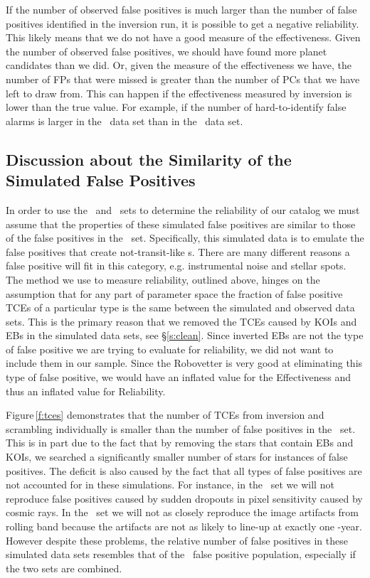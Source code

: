 If the number of observed false positives is much larger than the number of false positives identified in the inversion run, it is possible to get a negative reliability. This likely means that we do not have a good measure of the effectiveness.  Given the number of observed false positives, we should have found more planet candidates than we did. Or, given the measure of the effectiveness we have, the number of FPs that were missed is greater than the number of PCs that we have left to draw from.  This can happen if the effectiveness measured by inversion is lower than the true value. For example, if the number of hard-to-identify false alarms is larger in the \invtce\ data set than in the \opstce\ data set.   

\subsection{Discussion about the Similarity of the Simulated False Positives}
In order to use the \scrtce\ and \invtce\ sets to determine the reliability of our catalog we must assume that the properties of these simulated false positives are similar to those of the false positives in the \opstce\ set.  Specifically, this simulated data is to emulate the false positives that create not-transit-like \opstce s.  There are many different reasons a false positive will fit in this category, e.g. instrumental noise and stellar spots. The method we use to measure reliability, outlined above, hinges on the assumption that for any part of parameter space the fraction of false positive TCEs of a particular type is the same between the simulated and observed data sets.  This is the primary reason that we removed the TCEs caused by KOIs and EBs in the simulated data sets, see \S\ref{s:clean}. Since inverted EBs are not the type of false positive we are trying to evaluate for reliability, we did not want to include them in our sample. Since the Robovetter is very good at eliminating this type of false positive, we would have an inflated value for the Effectiveness and thus an inflated value for Reliability. 

Figure\,\ref{f:tces} demonstrates that the number of TCEs from inversion and scrambling individually is smaller than the number of false positives in the \opstce\ set. This is in part due to the fact that by removing the stars that contain EBs and KOIs, we searched a significantly smaller number of stars for instances of false positives. The deficit is also caused by the fact that all types of false positives are not accounted for in these simulations. For instance, in the \invtce\ set we will not reproduce false positives caused by sudden dropouts in pixel sensitivity caused by cosmic rays. In the \scrtce\ set we will not as closely reproduce the image artifacts from rolling band because the artifacts are not as likely to line-up at exactly one \Kepler-year.  However despite these problems, the relative number of false positives in these simulated data sets resembles that of the \opstce\ false positive population, especially if the two sets are combined.

